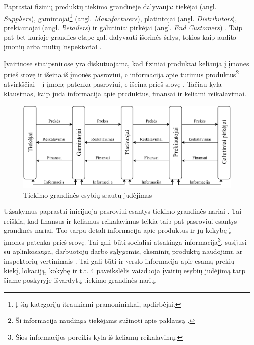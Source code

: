Paprastai fizinių produktų tiekimo grandinėje dalyvauja: tiekėjai (angl. \textit{Suppliers}), gamintojai\footnote{Į šią kategoriją įtraukiami pramonininkai, apdirbėjai.} (angl. \textit{Manufacturers}), platintojai (angl. \textit{Distributors}), prekiautojai (angl. \textit{Retailers}) ir galutiniai pirkėjai (angl. \textit{End Customers}) \cite{kopczak2003supply}. Taip pat bet kurioje grandies etape gali dalyvauti išorinės šalys, tokios kaip audito įmonių arba muitų inspektoriai \cite{webber2009building}.

Įvairiuose straipsniuose yra diskutuojama, kad fiziniai produktai keliauja į įmones prieš srovę ir išeina iš įmonės pasroviui, o informacija apie turimus produktus\footnote{Ši informacija naudinga tiekėjams sužinoti apie paklausą \cite{croson2005upstream}.} atvirkščiai – į įmonę patenka pasroviui, o išeina prieš srovę \cite{prajogo2012supply} \cite{croson2005upstream}. Tačiau kyla klausimas, kaip juda informacija apie produktus, finansai ir keliami reikalavimai.

\begin{figure}[H]
    \centering
    \includegraphics[scale=0.9]{images/supply-chain-entity-flow.pdf}
    \caption{Tiekimo grandinės esybių srautų judėjimas}
\end{figure}

Užsakymus paprastai inicijuoja pasroviui esantys tiekimo grandinės nariai \cite{croson2005upstream}. Tai reiškia, kad finansus ir keliamus reikalavimus teikia taip pat pasroviui esantys grandinės nariai. Tuo tarpu detali informacija apie produktus ir jų kokybę į įmones patenka prieš srovę. Tai gali būti socialiai atsakinga informacija\footnote{Šios informacijos poreikis kyla iš keliamų reikalavimų.}, susijusi su aplinkosauga, darbuotojų darbo sąlygomis, cheminių produktų naudojimu ar inspektorių vertinimais \cite{mani2015supply} \cite{vachon2006extending}. Tai gali būti ir verslo informacija apie esamą prekių kiekį, lokaciją, kokybę ir t.t. 4 paveikslėlis vaizduoja įvairių esybių judėjimą tarp šiame poskyryje išvardytų tiekimo grandinės narių.



